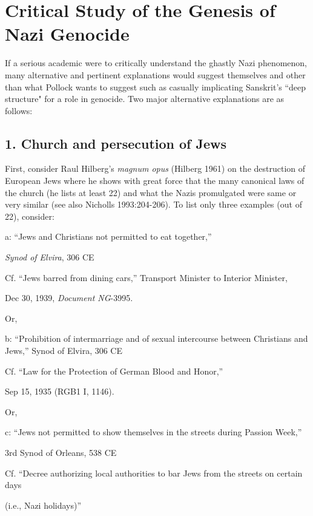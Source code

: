 \section*{Critical Study of the Genesis of Nazi Genocide}

If a serious academic were to critically understand the ghastly Nazi phenomenon, many alternative and pertinent explanations would suggest themselves and other than what Pollock wants to suggest such as casually implicating Sanskrit's ``deep structure" for a role in genocide. Two major alternative explanations are as follows:

\subsection*{1. Church and persecution of Jews}
First, consider Raul Hilberg's {\sl magnum opus} (Hilberg 1961) on the destruction of European Jews where he shows with great force that the many canonical laws of the church (he lists at least 22) and what the Nazis promulgated were same or very similar (see also Nicholls 1993:204-206). To list only three examples (out of 22), consider:

a: “Jews and Christians not permitted to eat together,”

{\sl Synod of Elvira}, 306 CE

Cf. “Jews barred from dining cars,” Transport Minister to Interior Minister, 

Dec 30, 1939, {\sl Document NG}-3995. 
\medskip

Or, 

b: “Prohibition of intermarriage and of sexual intercourse between Christians and Jews,” Synod of Elvira, 306 CE 

Cf. “Law for the Protection of German Blood and Honor,” 

Sep 15, 1935 (RGB1 I, 1146).
\medskip

Or,

c: “Jews not permitted to show themselves in the streets during Passion Week,” 

3rd  Synod of Orleans, 538 CE 

Cf. “Decree authorizing local authorities to bar Jews from the streets on certain days

(i.e., Nazi holidays)” 


